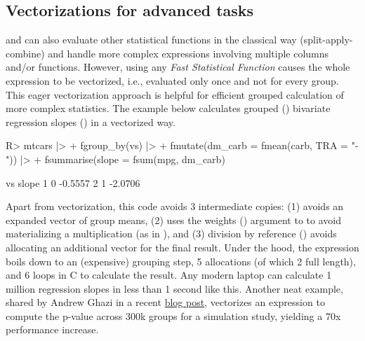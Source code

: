 \documentclass[article]{jss}
\newcommand{\fct}[1]{\code{#1()}}
\begin{document}
\subsection{Vectorizations for advanced tasks} \label{ssec:vfat}
%
\fct{fsummarise} and \fct{fmutate} can also evaluate other statistical functions in the classical way (split-apply-combine) and handle more complex expressions involving multiple columns and/or functions. However, using any \emph{Fast Statistical Function} causes the whole expression to be vectorized, i.e., evaluated only once and not for every group. This eager vectorization approach is helpful for efficient grouped calculation of more complex statistics. The example below calculates grouped () bivariate regression slopes () in a vectorized way.
%
\begin{Schunk}
\begin{Sinput}
R> mtcars |>
+   fgroup_by(vs) |>
+   fmutate(dm_carb = fmean(carb, TRA = "-")) |>
+   fsummarise(slope = fsum(mpg, dm_carb) %/=% fsum(dm_carb^2))
\end{Sinput}
\begin{Soutput}
  vs   slope
1  0 -0.5557
2  1 -2.0706
\end{Soutput}
\end{Schunk}
%
Apart from vectorization, this code avoids 3 intermediate copies: (1)  avoids an expanded vector of group means, (2)  uses the weights () argument to \fct{fsum} to avoid materializing a multiplication (as in ), and (3) division by reference (\code{\%/=\%}) avoids allocating an additional vector for the final result. Under the hood, the expression boils down to an (expensive) grouping step, 5 allocations (of which 2 full length), and 6 loops in C to calculate the result. Any modern laptop can calculate 1 million regression slopes in less than 1 second like this. Another neat example, shared by Andrew Ghazi in a recent \href{https://andrewghazi.github.io/posts/collapse_is_sick/sick.html}{blog post}, vectorizes an expression to compute the p-value across 300k groups for a simulation study, yielding a 70x performance increase. \newline
\end{document}
